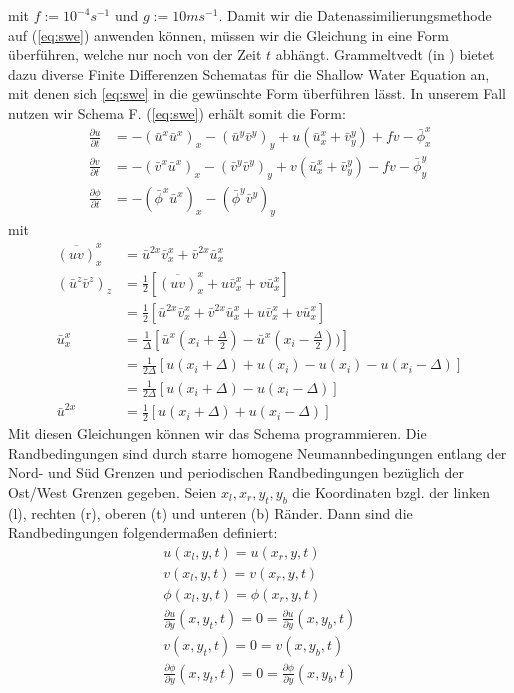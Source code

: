 mit $f := 10^{-4} s^{-1}$ und $g:= 10 ms^{-1}$.
Damit wir die Datenassimilierungsmethode auf (\ref{eq:swe}) anwenden können, müssen wir die Gleichung in eine Form überführen, welche nur noch von der Zeit $t$ abhängt. Grammeltvedt (in \cite{grammeltvedt}) bietet dazu diverse Finite Differenzen Schematas für die Shallow Water Equation an, mit denen sich \ref{eq:swe} in die gewünschte Form überführen lässt. In unserem Fall nutzen wir Schema F. (\ref{eq:swe}) erhält somit die Form:
\begin{equation}
 \begin{aligned}
  \frac{\partial u}{\partial t} &= -(\bar{u}^x\bar{u}^x)_x - (\bar{u}^y\bar{v}^y)_y + u(\bar{u}^x_x+ \bar{v}^y_y) +fv - \bar{\phi}^x_x\\
  \frac{\partial v}{\partial t} &= -(\bar{v}^x\bar{u}^x)_x - (\bar{v}^y\bar{v}^y)_y + v(\bar{u}^x_x+ \bar{v}^y_y) -fv - \bar{\phi}^y_y\\
  \frac{\partial \phi}{\partial t} &= -(\bar{\phi}^x\bar{u}^x)_x - (\bar{\phi}^y\bar{v}^y)_y   
 \end{aligned}
 \label{eq:schemef}
\end{equation}
mit \[
\begin{aligned}
\overline{(uv)}^x_x & = \bar{u}^{2x} \bar{v}^x_x +\bar{v}^{2x} \bar{u}^x_x \\
(\bar{u}^z\bar{v}^z)_z &= \frac{1}{2} \left[ \overline{(uv)}^x_x + u \bar{v}^x_x + v \bar{u}^x_x \right] \\
 &= \frac{1}{2} \left[ \bar{u}^{2x}\bar{v}^x_x +  \bar{v}^{2x}\bar{u}^x_x  + u \bar{v}^x_x + v \bar{u}^x_x \right]\\
 \bar{u}^x_x &= \frac{1}{\Delta} \left[ \bar{u}^x(x_i+\frac{\Delta}{2}) -\bar{u}^x(x_i-\frac{\Delta}{2})  ) \right]\\
	    &=  \frac{1}{2\Delta} \left[ u(x_i+\Delta)+u(x_i)-u(x_i)-u(x_i-\Delta) \right]\\
	    &=  \frac{1}{2\Delta} \left[ u(x_i+\Delta)-u(x_i-\Delta) \right]\\
 \bar{u}^{2x}&= \frac{1}{2} \left[ u(x_i+\Delta) + u(x_i - \Delta)\right]
\end{aligned}
\]
Mit diesen Gleichungen können wir das Schema programmieren. Die Randbedingungen sind durch starre homogene Neumannbedingungen entlang der Nord- und Süd Grenzen und periodischen Randbedingungen bezüglich der Ost/West Grenzen gegeben. Seien $x_l,x_r,y_t,y_b$ die Koordinaten bzgl. der linken (l), rechten (r), oberen (t) und unteren (b) Ränder. Dann sind die Randbedingungen folgendermaßen definiert:
\begin{equation}
 \begin{aligned}
  u(x_l,y,t) = u(x_r,y,t)\\
  v(x_l,y,t) = v(x_r,y,t)\\
  \phi(x_l,y,t) = \phi(x_r,y,t)\\
  \frac{\partial u}{\partial y}(x,y_t,t) = 0 = \frac{\partial u}{\partial y}(x,y_b,t)\\ 
  v(x,y_t,t) = 0 = v(x,y_b,t)\\
  \frac{\partial \phi}{\partial y}(x,y_t,t) = 0 = \frac{\partial \phi}{\partial y}(x,y_b,t)\\ 
 \end{aligned}
\end{equation}
